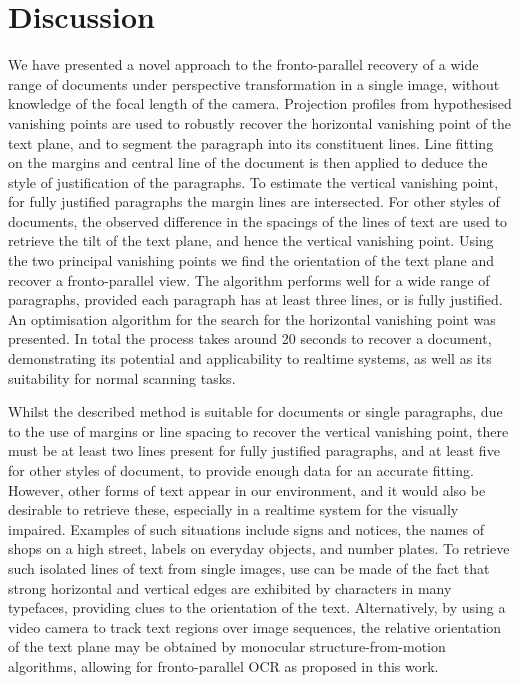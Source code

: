 \documentclass{article}
\begin{document}
% 






\section{Discussion}
\label{conclusions}

We have presented a novel approach to the fronto-parallel recovery of a wide range of documents under perspective transformation in a single image, without knowledge of the focal length of the camera.
Projection profiles from hypothesised vanishing points are used to robustly recover the horizontal vanishing point of the text plane, and to segment the paragraph into its constituent lines.
Line fitting on the margins and central line of the document is then applied to deduce the style of justification of the paragraphs.
To estimate the vertical vanishing point, for fully justified paragraphs the margin lines are intersected.
For other styles of documents, the observed difference in the spacings of the lines of text are used to retrieve the tilt of the text plane, and hence the vertical vanishing point.
Using the two principal vanishing points we find the orientation of the text plane and recover a fronto-parallel view.
The algorithm performs well for a wide range of paragraphs, provided each paragraph has at least three lines, or is fully justified.
An optimisation algorithm for the search for the horizontal vanishing point was presented.
In total the process takes around 20 seconds to recover a document, demonstrating its potential and applicability to realtime systems, as well as its suitability for normal scanning tasks.

Whilst the described method is suitable for documents or single paragraphs, due to the use of margins or line spacing to recover the vertical vanishing point, there must be at least two lines present for fully justified paragraphs, and at least five for other styles of document, to provide enough data for an accurate fitting.
However, other forms of text appear in our environment, and it would also be desirable to retrieve these, especially in a realtime system for the visually impaired.
Examples of such situations include signs and notices, the names of shops on a high street, labels on everyday objects, and number plates.
To retrieve such isolated lines of text from single images,
use can be made of the fact that strong horizontal and vertical edges are exhibited by characters in many typefaces, providing clues to the orientation of the text.
Alternatively, by using a video camera to track text regions over image sequences, the relative orientation of the text plane may be obtained by monocular structure-from-motion algorithms, allowing for fronto-parallel OCR as proposed in this work.
\end{document}
